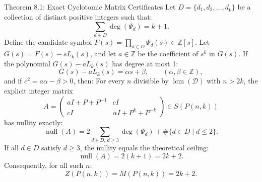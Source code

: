 \documentclass[11pt]{article}
\begin{document}
\begin{thmbox}{Theorem 8.1: Exact Cyclotomic Matrix Certificates}
Let $D = \{d_1, d_2, \dots, d_p\}$ be a collection of distinct positive integers such that:
\begin{equation}
  \sum_{d \in D} \deg(\Psi_d) = k + 1.
\end{equation}
Define the candidate symbol $F(s) = \prod_{d \in D} \Psi_d(s) \in \mathbb{Z}[s]$.
Let $G(s) = F(s) - s L_k(s)$, and let $a \in \mathbb{Z}$ be the coefficient of $s^k$ in $G(s)$.
If the polynomial $G(s) - a L_k(s)$ has degree at most 1:
\begin{equation}
  G(s) - a L_k(s) = \alpha s + \beta, \qquad (\alpha, \beta \in \mathbb{Z}),
\end{equation}
and if $c^2 = a\alpha - \beta > 0$, then:
For every $n$ divisible by $\operatorname{lcm}(\mathcal D)$ with $n > 2k$, the explicit integer matrix
\begin{equation}
  A = \begin{pmatrix} a I + P + P^{-1} & c I \\ c I & \alpha I + P^k + P^{-k} \end{pmatrix} \in S(P(n,k))
\end{equation}
has nullity exactly:
\begin{equation}
  \operatorname{null}(A) = 2 \sum_{d \in D, \, d \ge 3} \deg(\Psi_d) + \# \{ d \in D \mid d \le 2 \}.
\end{equation}
If all $d \in D$ satisfy $d \ge 3$, the nullity equals the theoretical ceiling:
\begin{equation}
  \operatorname{null}(A) = 2(k + 1) = 2k + 2.
\end{equation}
Consequently, for all such $n$:
\begin{equation}
  Z(P(n, k)) = M(P(n, k)) = 2k + 2.
\end{equation}
\end{thmbox}
\end{document}
